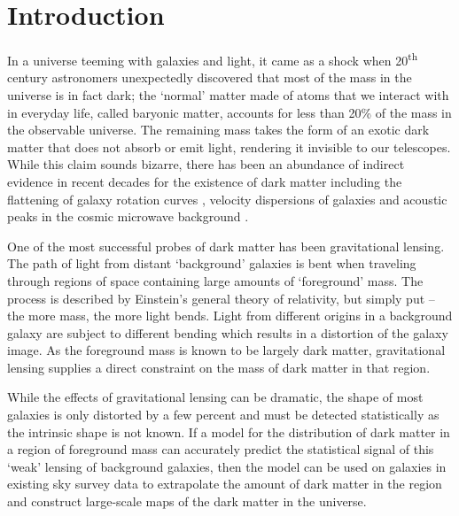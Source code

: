 \documentclass[%
 reprint,
 amsmath,amssymb,
 aps,nofootinbib
]{revtex4-1}
\begin{document}

\section{Introduction}

In a universe teeming with galaxies and light, it came as a shock when 20\textsuperscript{th} century astronomers unexpectedly discovered that most of the mass in the universe is in fact dark; the `normal' matter made of atoms that we interact with in everyday life, called baryonic matter, accounts for less than 20\% of the mass in the observable universe. The remaining mass takes the form of an exotic dark matter that does not absorb or emit light, rendering it invisible to our telescopes. While this claim sounds bizarre, there has been an abundance of indirect evidence in recent decades for the existence of dark matter including the flattening of galaxy rotation curves \cite{rotation_curve}, velocity dispersions of galaxies \cite{zwicky} and acoustic peaks in the cosmic microwave background \cite{planck_2015}.

One of the most successful probes of dark matter has been gravitational lensing. The path of light from distant `background' galaxies is bent when traveling through regions of space containing large amounts of `foreground' mass. The process is described by Einstein's general theory of relativity, but simply put -- the more mass, the more light bends. Light from different origins in a background galaxy are subject to different bending which results in a distortion of the galaxy image. As the foreground mass is known to be largely dark matter, gravitational lensing supplies a direct constraint on the mass of dark matter in that region.

While the effects of gravitational lensing can be dramatic, the shape of most galaxies is only distorted by a few percent and must be detected statistically as the intrinsic shape is not known. If a model for the distribution of dark matter in a region of foreground mass can accurately predict the statistical signal of this `weak' lensing of background galaxies, then the model can be used on galaxies in existing sky survey data to extrapolate the amount of dark matter in the region and construct large-scale maps of the dark matter in the universe.
\end{document}

